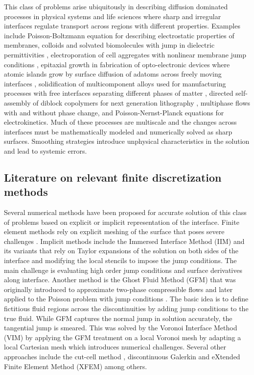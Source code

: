 \documentclass{elsarticle}
\begin{document}
This class of problems arise ubiquitously in describing diffusion dominated processes in physical systems and life sciences where sharp and irregular interfaces regulate transport across regions with different properties. Examples include Poisson-Boltzmann equation for describing electrostatic properties of membranes, colloids and solvated biomolecules with jump in dielectric permittivities \cite{sharp1990calculating,MirzadehPB}, electroporation of cell aggregates with nonlinear membrane jump conditions \cite{mistani2019parallel}, epitaxial growth in fabrication of opto-electronic devices where atomic islands grow by surface diffusion of adatoms across freely moving interfaces \cite{MISTANI2018150}, solidification of multicomponent alloys used for manufacturing processes with free interfaces separating different phases of matter \citep{theillard2015sharp,bochkov2021sharp}, directed self-assembly of diblock copolymers for next generation lithography \cite{galatsis2010patterning,ouaknin2018level,bochkov2021non}, multiphase flows with and without phase change, and Poisson-Nernst-Planck equations for electrokinetics. Much of these processes are multiscale and the changes across interfaces must be mathematically modeled and numerically solved as sharp surfaces. Smoothing strategies introduce unphysical characteristics in the solution and lead to systemic errors.

\subsection{Literature on relevant finite discretization methods}
Several numerical methods have been proposed for accurate solution of this class of problems based on explicit or implicit representation of the interface. Finite element methods rely on explicit meshing of the surface that poses severe challenges \cite{babuvska1970finite,bramble1996finite}. Implicit methods include the Immersed Interface Method (IIM) \cite{leveque1994immersed} and its variants \cite{adams2002immersed,li2003new,ewing1999immersed,gong2008immersed} that rely on Taylor expansions of the solution on both sides of the interface and modifying the local stencils to impose the jump conditions. The main challenge is evaluating high order jump conditions and surface derivatives along interface. Another method is the Ghost Fluid Method (GFM) \cite{fedkiw1999non} that was originally introduced to approximate two-phase compressible flows and later applied to the Poisson problem with jump conditions \cite{liu2000boundary}. The basic idea is to define fictitious fluid regions across the discontinuities by adding jump conditions to the true fluid. While GFM captures the normal jump in solution accurately, the tangential jump is smeared. This was solved by the Voronoi Interface Method (VIM) \cite{guittet2015solving} by applying the GFM treatment on a local Voronoi mesh by adapting a local Cartesian mesh which introduces numerical challenges. Several other approaches include the cut-cell method \cite{crockett2011cartesian}, discontinuous Galerkin and eXtended Finite Element Method (XFEM) \cite{lew2008discontinuous,moes1999finite,belytschko2001arbitrary} among others.
\end{document}
